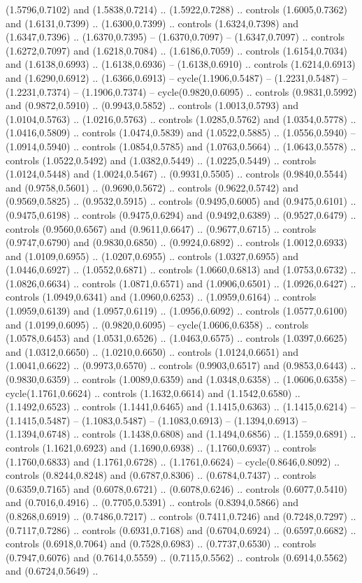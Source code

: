 {(1.5796,0.7102) and (1.5838,0.7214) .. (1.5922,0.7288) .. controls (1.6005,0.7362) and (1.6131,0.7399) .. (1.6300,0.7399) .. controls (1.6324,0.7398) and (1.6347,0.7396) .. (1.6370,0.7395) -- (1.6370,0.7097) -- (1.6347,0.7097) .. controls (1.6272,0.7097) and (1.6218,0.7084) .. (1.6186,0.7059) .. controls (1.6154,0.7034) and (1.6138,0.6993) .. (1.6138,0.6936) -- (1.6138,0.6910) .. controls (1.6214,0.6913) and (1.6290,0.6912) .. (1.6366,0.6913) -- cycle(1.1906,0.5487) -- (1.2231,0.5487) -- (1.2231,0.7374) -- (1.1906,0.7374) -- cycle(0.9820,0.6095) .. controls (0.9831,0.5992) and (0.9872,0.5910) .. (0.9943,0.5852) .. controls (1.0013,0.5793) and (1.0104,0.5763) .. (1.0216,0.5763) .. controls (1.0285,0.5762) and (1.0354,0.5778) .. (1.0416,0.5809) .. controls (1.0474,0.5839) and (1.0522,0.5885) .. (1.0556,0.5940) -- (1.0914,0.5940) .. controls (1.0854,0.5785) and (1.0763,0.5664) .. (1.0643,0.5578) .. controls (1.0522,0.5492) and (1.0382,0.5449) .. (1.0225,0.5449) .. controls (1.0124,0.5448) and (1.0024,0.5467) .. (0.9931,0.5505) .. controls (0.9840,0.5544) and (0.9758,0.5601) .. (0.9690,0.5672) .. controls (0.9622,0.5742) and (0.9569,0.5825) .. (0.9532,0.5915) .. controls (0.9495,0.6005) and (0.9475,0.6101) .. (0.9475,0.6198) .. controls (0.9475,0.6294) and (0.9492,0.6389) .. (0.9527,0.6479) .. controls (0.9560,0.6567) and (0.9611,0.6647) .. (0.9677,0.6715) .. controls (0.9747,0.6790) and (0.9830,0.6850) .. (0.9924,0.6892) .. controls (1.0012,0.6933) and (1.0109,0.6955) .. (1.0207,0.6955) .. controls (1.0327,0.6955) and (1.0446,0.6927) .. (1.0552,0.6871) .. controls (1.0660,0.6813) and (1.0753,0.6732) .. (1.0826,0.6634) .. controls (1.0871,0.6571) and (1.0906,0.6501) .. (1.0926,0.6427) .. controls (1.0949,0.6341) and (1.0960,0.6253) .. (1.0959,0.6164) .. controls (1.0959,0.6139) and (1.0957,0.6119) .. (1.0956,0.6092) .. controls (1.0577,0.6100) and (1.0199,0.6095) .. (0.9820,0.6095) -- cycle(1.0606,0.6358) .. controls (1.0578,0.6453) and (1.0531,0.6526) .. (1.0463,0.6575) .. controls (1.0397,0.6625) and (1.0312,0.6650) .. (1.0210,0.6650) .. controls (1.0124,0.6651) and (1.0041,0.6622) .. (0.9973,0.6570) .. controls (0.9903,0.6517) and (0.9853,0.6443) .. (0.9830,0.6359) .. controls (1.0089,0.6359) and (1.0348,0.6358) .. (1.0606,0.6358) -- cycle(1.1761,0.6624) .. controls (1.1632,0.6614) and (1.1542,0.6580) .. (1.1492,0.6523) .. controls (1.1441,0.6465) and (1.1415,0.6363) .. (1.1415,0.6214) -- (1.1415,0.5487) -- (1.1083,0.5487) -- (1.1083,0.6913) -- (1.1394,0.6913) -- (1.1394,0.6748) .. controls (1.1438,0.6808) and (1.1494,0.6856) .. (1.1559,0.6891) .. controls (1.1621,0.6923) and (1.1690,0.6938) .. (1.1760,0.6937) .. controls (1.1760,0.6833) and (1.1761,0.6728) .. (1.1761,0.6624) -- cycle(0.8646,0.8092) .. controls (0.8244,0.8248) and (0.6787,0.8306) .. (0.6784,0.7437) .. controls (0.6359,0.7165) and (0.6078,0.6721) .. (0.6078,0.6246) .. controls (0.6077,0.5410) and (0.7016,0.4916) .. (0.7705,0.5391) .. controls (0.8394,0.5866) and (0.8268,0.6919) .. (0.7486,0.7217) .. controls (0.7411,0.7246) and (0.7248,0.7297) .. (0.7117,0.7286) .. controls (0.6931,0.7168) and (0.6704,0.6924) .. (0.6597,0.6682) .. controls (0.6918,0.7064) and (0.7528,0.6983) .. (0.7737,0.6530) .. controls (0.7947,0.6076) and (0.7614,0.5559) .. (0.7115,0.5562) .. controls (0.6914,0.5562) and (0.6724,0.5649) .. }
